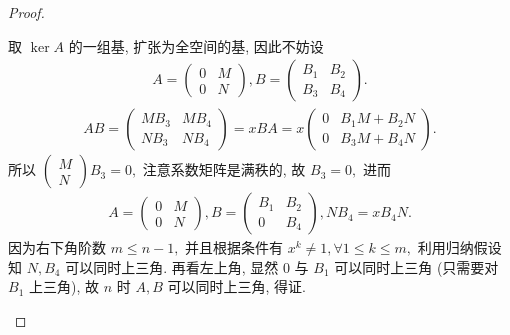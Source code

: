 \documentclass[../../main.tex]{subfiles}%
\begin{document}
\begin{proof}
\begin{enumerate}[(1)]
取 \(\ker A\) 的一组基, 扩张为全空间的基, 因此不妨设
\begin{align*}
A = \begin{pmatrix} 0 & M \\ 0 & N \end{pmatrix}, B = \begin{pmatrix} B_1 & B_2 \\ B_3 & B_4 \end{pmatrix}.
\end{align*}
\begin{align*}
AB = \begin{pmatrix} MB_3 & MB_4 \\ NB_3 & NB_4 \end{pmatrix} = xBA = x \begin{pmatrix} 0 & B_1M+B_2N \\ 0 & B_3M+B_4N \end{pmatrix}.
\end{align*}
所以 \(\begin{pmatrix} M \\ N \end{pmatrix} B_3 = 0,\) 注意系数矩阵是满秩的, 故 \(B_3=0,\) 进而
\begin{align*}
A = \begin{pmatrix} 0 & M \\ 0 & N \end{pmatrix}, B = \begin{pmatrix} B_1 & B_2 \\ 0 & B_4 \end{pmatrix}, NB_4 = xB_4N.
\end{align*}
因为右下角阶数 \(m \leqslant n-1,\) 并且根据条件有 \(x^k \ne 1, \forall 1 \leqslant k \leqslant m,\) 利用归纳假设知 \(N, B_4\) 可以同时上三角. 再看左上角, 显然 \(0\) 与 \(B_1\) 可以同时上三角 (只需要对 \(B_1\) 上三角), 故 \(n\) 时 \(A, B\) 可以同时上三角, 得证.


\end{enumerate}
\end{proof}
\end{document}
